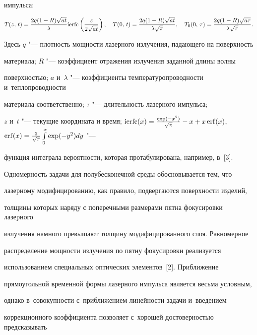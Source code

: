 импульса:

\begin{equation}

\label{gurevs:eq1}

T(z,\, t) = \frac{2q(1 - R)\sqrt {at} }{\lambda }{\rm ierfc}\left( {\frac{z}{2\sqrt 

{at} }} \right),

\quad 

T(0,\,t) = \frac{2q(1 - R)\sqrt {at} }{\lambda \sqrt \pi },

\quad

T_0 (0,\,\tau ) = \frac{2q(1 - R)\sqrt {a\tau } }{\lambda \sqrt \pi }.

\end{equation}

Здесь $q$ "--- плотность мощности лазерного излучения, падающего на поверхность 

материала; $R$ "--- коэффициент отражения излучения заданной длины волны 

поверхностью; $a$ и~$\lambda $ "--- коэффициенты температуропроводности и~теплопроводности 

материала соответственно; $\tau $ "--- длительность лазерного импульса; 

$z$ и~$t$ "--- текущие координата и время; ${\rm ierfc}(x) = \frac{\exp ( - x^2)}{ \sqrt \pi} - x + 

x{\,\rm erf}(x)$, ${\rm erf}(x) = \frac2{\sqrt \pi}\int\limits_0^x {\exp ( - y^2} )dy$ "--- 

функция интеграла вероятности, которая протабулирована, например, в~[3]. 

Одномерность задачи для полубесконечной среды обосновывается тем, что 

лазерному модифицированию, как правило, подвергаются поверхности изделий, 

толщины которых наряду с поперечными размерами пятна фокусировки лазерного 

излучения намного превышают толщину модифицированного слоя. Равномерное 

распределение мощности излучения по пятну фокусировки реализуется 

использованием специальных оптических элементов~[2]. Приближение 

прямоугольной временной формы лазерного импульса является весьма условным, 

однако в~совокупности с~приближением линейности задачи и~введением 

коррекционного коэффициента позволяет с~хорошей достоверностью предсказывать 

